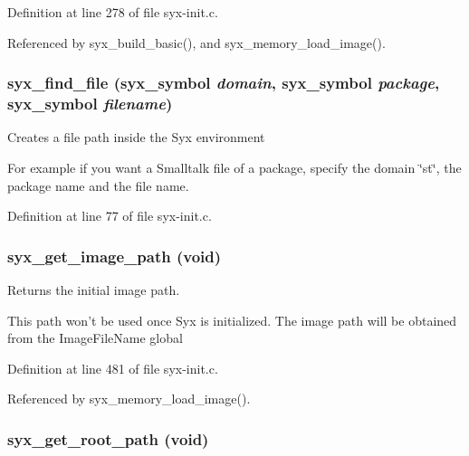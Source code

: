 Definition at line 278 of file syx-init.c.

Referenced by syx\_\-build\_\-basic(), and syx\_\-memory\_\-load\_\-image().\hypertarget{syx-init_8c_0a366be8ef1ce96df07d6084ccfaa249}{
\subsubsection{ syx\_\-find\_\-file ({\bf syx\_\-symbol} {\em domain}, \/  {\bf syx\_\-symbol} {\em package}, \/  {\bf syx\_\-symbol} {\em filename})}}
\label{syx-init_8c_0a366be8ef1ce96df07d6084ccfaa249}


Creates a file path inside the Syx environment

For example if you want a Smalltalk file of a package, specify the domain \char`\"{}st\char`\"{}, the package name and the file name. 

Definition at line 77 of file syx-init.c.\hypertarget{syx-init_8c_f196de4e97fe418abd021a26120fdc3c}{
\subsubsection{ syx\_\-get\_\-image\_\-path (void)}}
\label{syx-init_8c_f196de4e97fe418abd021a26120fdc3c}


Returns the initial image path.

This path won't be used once Syx is initialized. The image path will be obtained from the ImageFileName global 

Definition at line 481 of file syx-init.c.

Referenced by syx\_\-memory\_\-load\_\-image().\hypertarget{syx-init_8c_481a3f64c46f5b828aea978939c74e4c}{
\subsubsection{ syx\_\-get\_\-root\_\-path (void)}}
\label{syx-init_8c_481a3f64c46f5b828aea978939c74e4c}


